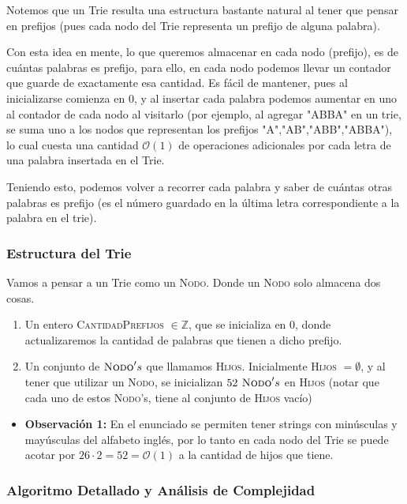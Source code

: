 	 Notemos que un Trie resulta una estructura bastante natural al tener que pensar en prefijos (pues cada nodo del Trie representa un prefijo de alguna palabra). 
	
	Con esta idea en mente, lo que queremos almacenar en cada nodo (prefijo), es de cuántas palabras es prefijo, para ello, en cada nodo podemos llevar un contador que guarde de exactamente esa cantidad. Es fácil de mantener, pues al inicializarse comienza en $0$, y al insertar cada palabra podemos aumentar en uno al contador de cada nodo al visitarlo (por ejemplo, al agregar "ABBA" en un trie, se suma uno a los nodos que representan los prefijos "A","AB","ABB","ABBA"), lo cual cuesta una cantidad $\mathcal{O}(1)$ de operaciones adicionales por cada letra de una palabra insertada en el Trie.
	
	Teniendo esto, podemos volver a recorrer cada palabra y saber de cuántas otras palabras es prefijo (es el número guardado en la última letra correspondiente a la palabra en el trie).
	
\subsubsection{Estructura del Trie}

Vamos a pensar a un Trie como un \textsc{Nodo}. Donde un \textsc{Nodo} solo almacena dos cosas.
\begin{enumerate}
	\item Un entero \textsc{CantidadPrefijos} $\in \mathbb{Z}$, que se inicializa en $0$, donde actualizaremos la cantidad de palabras que tienen a dicho prefijo.
	\item Un conjunto de $\textsc{Nodo}'s$ que llamamos \textsc{Hijos}. Inicialmente \textsc{Hijos} $ = \emptyset$, y al tener que utilizar un \textsc{Nodo}, se inicializan $ 52 \textsc{ Nodo}'s$ en \textsc{Hijos} (notar que cada uno de estos \textsc{Nodo}'s, tiene al conjunto de \textsc{Hijos} vacío)
\end{enumerate}


\begin{itemize}
		\item \textbf{Observación 1:} En el enunciado se permiten tener strings con minúsculas y mayúsculas del alfabeto inglés, por lo tanto en cada nodo del Trie se puede acotar por $26 \cdot 2 = 52 = \mathcal{O}(1)$ a la cantidad de hijos que tiene.
\end{itemize}

\subsubsection{Algoritmo Detallado y Análisis de Complejidad }
	
